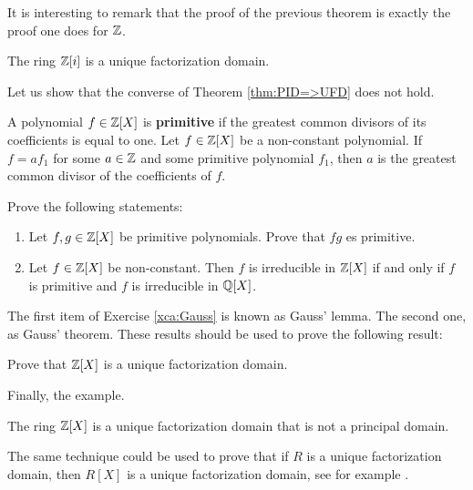 It is interesting to remark that the proof 
of the previous theorem is exactly the proof
one does for $\mathbb{Z}$. 

\begin{example}
	The ring $\mathbb{Z}[i]$ is a unique factorization domain. 	
\end{example}

Let us show that the converse of Theorem \ref{thm:PID=>UFD} does not hold. 

\begin{exercise}
\label{xca:content}
	A polynomial $f\in\mathbb{Z}[X]$ is \textbf{primitive} if
	the greatest common divisors of its coefficients is equal to one. 
	Let $f\in\mathbb{Z}[X]$ be a non-constant polynomial. If $f=af_1$ for some $a\in\mathbb{Z}$ and some
	primitive polynomial $f_1$, then $a$ is the greatest common divisor of the coefficients of $f$. 	
\end{exercise}


\begin{exercise}
\label{xca:Gauss}
Prove the following statements:
\begin{enumerate}
    \item Let $f,g\in\mathbb{Z}[X]$ be primitive polynomials. Prove that $fg$ es primitive.
    \item Let $f\in\mathbb{Z}[X]$ be non-constant. Then
$f$ is irreducible in $\mathbb{Z}[X]$ if and only if $f$ is primitive and 
$f$ is irreducible in $\mathbb{Q}[X]$. 
\end{enumerate}
\end{exercise}

The first item of Exercise \ref{xca:Gauss} is known as Gauss' lemma.
The second one, as Gauss' theorem. These results should be used to prove
the following result: 

\begin{exercise}
\label{xca:Z[X]_UFD}
    Prove that $\mathbb{Z}[X]$ is a unique factorization domain. 
\end{exercise}

Finally, the example. 

\begin{example}
	The ring $\mathbb{Z}[X]$ is a unique factorization 
	domain that is not a principal domain. 	
\end{example}

The same technique could be used to prove that if 
$R$ is a unique factorization domain, then $R[X]$ is a unique factorization domain, see
for example \cite[Chapter III, Theorem 6.14]{MR600654}.  
